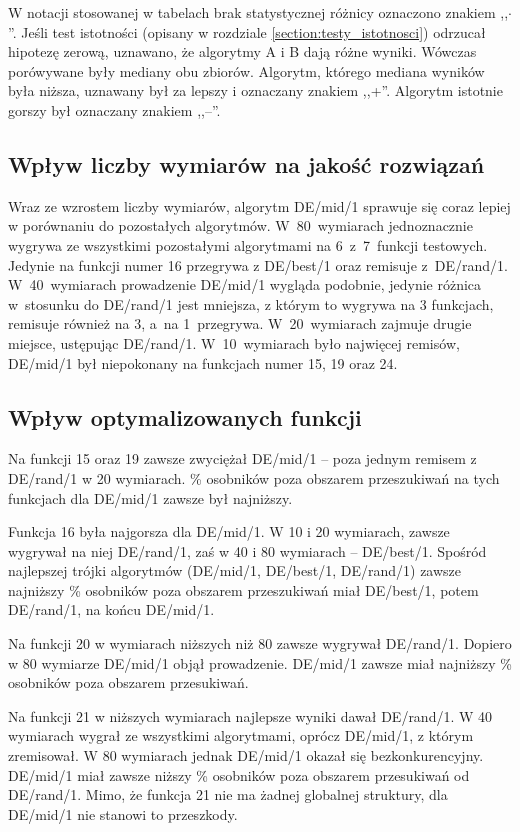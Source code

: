 \documentclass[a4paper,onecolumn,oneside,12pt,wide,floatssmall]{mwrep}
\theoremstyle{definition}
\theoremstyle{plain}%
\theoremstyle{remark}
\begin{document}
W notacji stosowanej w tabelach brak statystycznej różnicy oznaczono znakiem ,,$\cdotp$''.
Jeśli test istotności (opisany w rozdziale \ref{section:testy_istotnosci})
odrzucał hipotezę zerową, uznawano, że algorytmy A i B dają różne wyniki.
Wówczas porówywane były mediany obu zbiorów. Algorytm, którego mediana wyników była niższa,
uznawany był za lepszy i oznaczany znakiem ,,+''. Algorytm istotnie gorszy był oznaczany znakiem ,,--''.

\subsection{Wpływ liczby wymiarów na jakość rozwiązań}

Wraz ze wzrostem liczby wymiarów, algorytm DE/mid/1 sprawuje się coraz lepiej w porównaniu do
pozostałych algorytmów.
W~80~wymiarach jednoznacznie wygrywa ze wszystkimi pozostałymi algorytmami na 6~z~7~funkcji testowych.
Jedynie na funkcji numer 16 przegrywa z DE/best/1 oraz remisuje z~DE/rand/1.
W~40~wymiarach prowadzenie DE/mid/1 wygląda podobnie, jedynie różnica w~stosunku do DE/rand/1
jest mniejsza, z którym to wygrywa na 3 funkcjach, remisuje również na 3, a~na 1~przegrywa.
W~20~wymiarach zajmuje drugie miejsce, ustępując DE/rand/1.
W~10~wymiarach było najwięcej remisów, DE/mid/1 był niepokonany na funkcjach numer 15, 19 oraz 24.

\subsection{Wpływ optymalizowanych funkcji}

Na funkcji 15 oraz 19 zawsze zwyciężał DE/mid/1 -- poza jednym remisem z DE/rand/1 w 20 wymiarach.
\% osobników poza obszarem przeszukiwań na tych funkcjach dla DE/mid/1 zawsze był najniższy.

Funkcja 16 była najgorsza dla DE/mid/1. W 10 i 20 wymiarach, zawsze wygrywał na niej DE/rand/1,
zaś w 40 i 80 wymiarach -- DE/best/1. Spośród najlepszej trójki algorytmów (DE/mid/1, DE/best/1,
DE/rand/1) zawsze najniższy \% osobników poza obszarem przeszukiwań miał DE/best/1, 
potem DE/rand/1, na końcu DE/mid/1. 

Na funkcji 20 w wymiarach niższych niż 80 zawsze wygrywał DE/rand/1. Dopiero w 80 wymiarze DE/mid/1
objął prowadzenie. DE/mid/1 zawsze miał najniższy \% osobników poza obszarem przesukiwań.

Na funkcji 21 w niższych wymiarach najlepsze wyniki dawał DE/rand/1. W 40 wymiarach wygrał ze 
wszystkimi algorytmami, oprócz DE/mid/1, z którym zremisował. W 80 wymiarach jednak DE/mid/1
okazał się bezkonkurencyjny. DE/mid/1 miał zawsze niższy \% osobników poza obszarem przesukiwań
od DE/rand/1. Mimo, że funkcja 21 nie ma żadnej globalnej struktury, dla DE/mid/1 nie stanowi to 
przeszkody.
\end{document}
